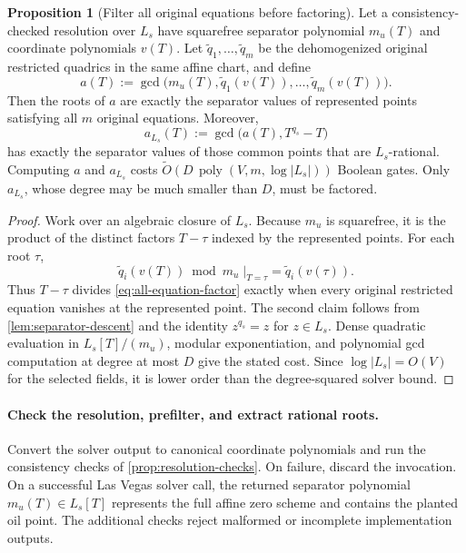 \documentclass[11pt,a4paper]{article}
\theoremstyle{definition}
\newtheorem{proposition}[theorem]{Proposition}
\theoremstyle{remark}
\newcommand{\softO}{\widetilde O}
\begin{document}
\begin{proposition}[Filter all original equations before factoring]\label{prop:separator-prefilter}
Let a consistency-checked resolution over $L_s$ have squarefree separator polynomial $m_u(T)$ and coordinate polynomials $v(T)$.  Let $\widetilde q_1,\ldots,\widetilde q_m$ be the dehomogenized original restricted quadrics in the same affine chart, and define
\begin{equation}\label{eq:all-equation-factor}
a(T):=\gcd\bigl(m_u(T),\widetilde q_1(v(T)),\ldots,\widetilde q_m(v(T))\bigr).
\end{equation}
Then the roots of $a$ are exactly the separator values of represented points satisfying all $m$ original equations.  Moreover,
\begin{equation}\label{eq:rational-factor}
a_{L_s}(T):=\gcd\bigl(a(T),T^{q_s}-T\bigr)
\end{equation}
has exactly the separator values of those common points that are $L_s$-rational.  Computing $a$ and $a_{L_s}$ costs $\softO\!\left(D\,\operatorname{poly}(V,m,\log|L_s|)\right)$ Boolean gates.  Only $a_{L_s}$, whose degree may be much smaller than $D$, must be factored.
\end{proposition}

\begin{proof}
Work over an algebraic closure of $L_s$.  Because $m_u$ is squarefree, it is the product of the distinct factors $T-\tau$ indexed by the represented points.  For each root $\tau$,
\[
\widetilde q_i(v(T))\bmod m_u\;\big|_{T=\tau}=\widetilde q_i(v(\tau)).
\]
Thus $T-\tau$ divides \eqref{eq:all-equation-factor} exactly when every original restricted equation vanishes at the represented point.  The second claim follows from \cref{lem:separator-descent} and the identity $z^{q_s}=z$ for $z\in L_s$.  Dense quadratic evaluation in $L_s[T]/(m_u)$, modular exponentiation, and polynomial gcd computation at degree at most $D$ give the stated cost.  Since $\log|L_s|=O(V)$ for the selected fields, it is lower order than the degree-squared solver bound.
\end{proof}

\paragraph{Check the resolution, prefilter, and extract rational roots.}
Convert the solver output to canonical coordinate polynomials and run the consistency checks of \cref{prop:resolution-checks}.  On failure, discard the invocation.  On a successful Las Vegas solver call, the returned separator polynomial $m_u(T)\in L_s[T]$ represents the full affine zero scheme and contains the planted oil point.  The additional checks reject malformed or incomplete implementation outputs.
\end{document}
